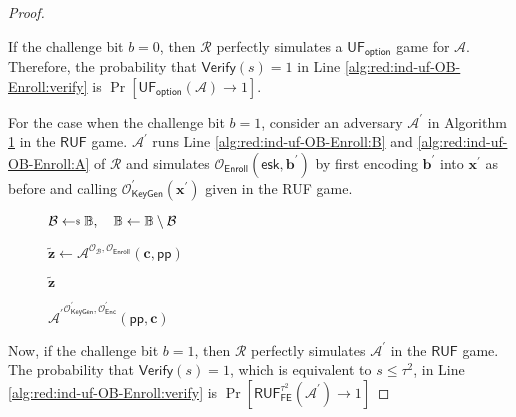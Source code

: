 \begin{proof}
\begin{figure}[h]
\end{figure}

	If the challenge bit $b = 0$, then $\mathcal{R}$ perfectly simulates a $\textsf{UF}_{\textsf{option}}$ game for $\mathcal{A}$. Therefore, the probability that $\textsf{Verify}(s) = 1$ in Line \ref{alg:red:ind-uf-OB-Enroll:verify} is $\Pr[\textsf{UF}_{\textsf{option}}(\mathcal{A}) \to 1]$.

	For the case when the challenge bit $b = 1$, consider an adversary $\mathcal{A}^\prime$ in Algorithm \ref{alg:adv:ind-uf-OB-Enroll} in the $\textsf{RUF}$ game. $\mathcal{A}^\prime$ runs Line \ref{alg:red:ind-uf-OB-Enroll:B} and \ref{alg:red:ind-uf-OB-Enroll:A} of $\mathcal{R}$ and simulates $\mathcal{O}_{\textsf{Enroll}}( \textsf{esk}, \mathbf{b}^\prime )$ by first encoding $\mathbf{b}^\prime$ into $\mathbf{x}^\prime$ as before and calling $\mathcal{O}_\textsf{KeyGen}^\prime(\mathbf{x}^\prime)$ given in the \textsf{RUF} game. 


\begin{figure}[h]
\centering

	\begin{minipage}[t]{0.45\textwidth}
	\begin{algorithm}[H]
	\caption{${\mathcal{A}^\prime}^{\mathcal{O}^\prime_{\textsf{KeyGen}}, \mathcal{O}^\prime_{\textsf{Enc}} }(\textsf{pp}, \mathbf{c})$}
	\label{alg:adv:ind-uf-OB-Enroll}
	\begin{algorithmic}[1]
		\State $\mathcal{B} \getsdollar \mathbb{B}, \quad \mathbb{B} \gets \mathbb{B} \setminus \mathcal{B}$ 
		
		\State $\mathbf{\tilde{z}} \gets {\mathcal{A}}^{\mathcal{O}_{\mathcal{B}}, \mathcal{O}_\textsf{Enroll} } (\mathbf{c}, \textsf{pp})$

		\State \Return $\mathbf{\tilde{z}}$
	\end{algorithmic}
	\end{algorithm}
	\end{minipage}

\end{figure}

Now, if the challenge bit $b = 1$, then $\mathcal{R}$ perfectly simulates $\mathcal{A}^\prime$ in the $\textsf{RUF}$ game. The probability that $\textsf{Verify}(s) = 1$, which is equivalent to $s \leq \tau^2$, in Line \ref{alg:red:ind-uf-OB-Enroll:verify} is $\Pr[\textsf{RUF}^{\tau^2}_{\textsf{FE}}(\mathcal{A}^\prime) \to 1 ]$


\end{proof}
